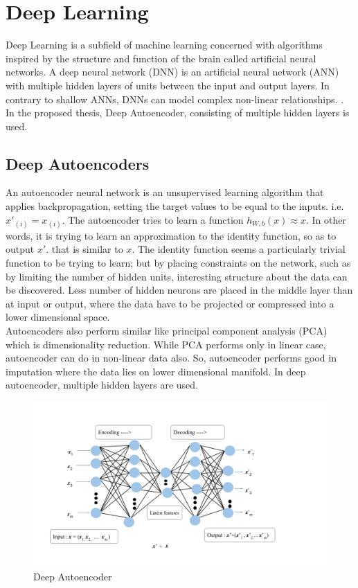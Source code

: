 \section{Deep Learning}
Deep Learning is a subfield of machine learning concerned with algorithms inspired by the structure and function of the brain called artificial neural networks.
A deep neural network (DNN) is an artificial neural network (ANN) with multiple hidden layers of units between the input and output layers. In contrary to shallow ANNs, DNNs can model complex non-linear relationships. \cite{Goodfellow_et_al_2016}. In the proposed thesis, Deep Autoencoder, consisting of multiple hidden layers is used.
\subsection{Deep Autoencoders}
An autoencoder neural network is an unsupervised learning algorithm that applies backpropagation, setting the target values to be equal to the inputs. 
i.e. \(x'_{(i)} = x_{(i)} \).
The autoencoder tries to learn a function \(h_{W,b}(x)\approx x\). In other words, it is trying to learn an approximation to the identity function, so as to output $x'$.  that is similar to $x$. The identity function seems a particularly trivial function to be trying to learn; but by placing constraints on the network, such as by limiting the number of hidden units, interesting structure about the data can be discovered. Less number of hidden neurons are placed in the middle layer than at input or output, where the data have to be projected or compressed into a lower dimensional space. \cite{hinton_autoencoder}
\\
Autoencoders also perform similar like principal component analysis (PCA) which is dimensionality reduction. While PCA performs only in linear case, autoencoder can do in non-linear data also. So, autoencoder performs good in imputation where the data lies on lower dimensional manifold. In deep autoencoder, multiple hidden layers are used.
\begin{figure}[H]
\centering
\includegraphics[width=19cm ]{figures/autoencoder.png}
\caption{\label{fig:autoencoder} Deep Autoencoder }
\end{figure}


